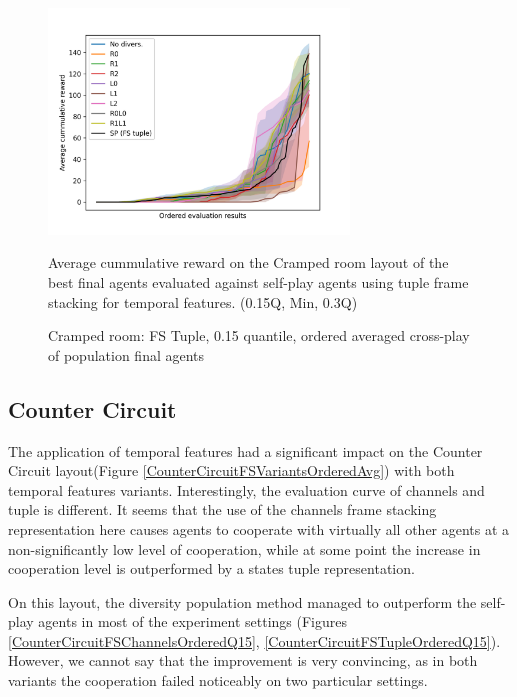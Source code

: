 \begin{figure}[!ht]
    \centering
    \includegraphics*[width=8cm]{../img/CrampedRoomFSTupleOrdered15Q.png}

    \caption{Cramped room: FS Tuple, 0.15 quantile, ordered averaged cross-play of population final agents}
    \label{CrampedRoomFSTupleOrdered15Q}
    \medskip
    \small 
    Average cummulative reward on the Cramped room layout of the best final agents evaluated against self-play agents using tuple frame stacking for temporal features.
    (0.15Q, Min, 0.3Q)

\end{figure}

\newpage

\subsection{Counter Circuit}
The application of temporal features had a significant impact on the Counter Circuit layout(Figure \ref{CounterCircuitFSVariantsOrderedAvg}) with both temporal features variants.
Interestingly, the evaluation curve of channels and tuple is different. 
It seems that the use of the channels frame stacking representation here causes agents to cooperate with virtually all other agents at a non-significantly low level of cooperation, while at some point the increase in cooperation level is outperformed by a states tuple representation.

On this layout, the diversity population method managed to outperform the self-play agents in most of the experiment settings (Figures \ref {CounterCircuitFSChannelsOrderedQ15}, \ref {CounterCircuitFSTupleOrderedQ15}).
However, we cannot say that the improvement is very convincing, as in both variants the cooperation failed noticeably on two particular settings. 


